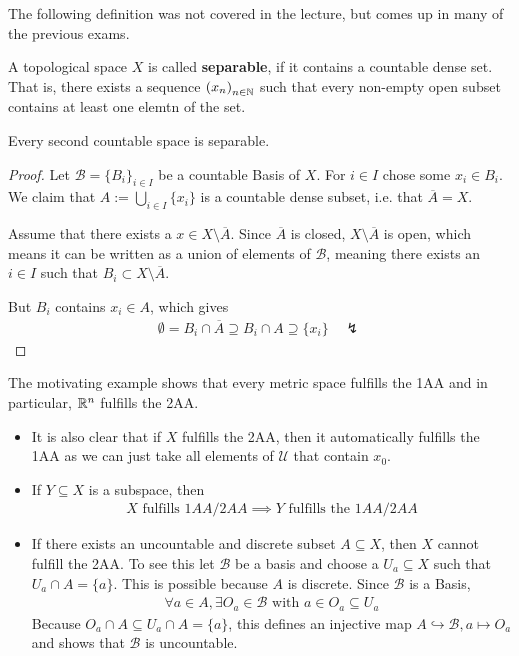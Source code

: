 The following definition was not covered in the lecture, but comes up in many of the previous exams.
\begin{dfn}[]
  A topological space $X$ is called \textbf{separable}, if it contains a countable dense set.
  That is, there exists a sequence $\left(x_{n}\right)_{n \in \mathbb{N}}$ such that every non-empty open subset contains at least one elemtn of the set.
\end{dfn}
\begin{lem}[]
  Every second countable space is separable.
\end{lem}
\begin{proof}
  Let $\mathcal{B} = \{B_i\}_{i \in I}$ be a countable Basis of $X$.
  For $i \in I$ chose some $x_i \in B_i$. 
  We claim that $A := \bigcup_{i \in I} \{x_i\}$ is a countable dense subset, i.e. that $\overline{A} = X$.

  Assume that there exists a $x \in X \setminus \overline{A}$. 
  Since $\overline{A}$ is closed, $X \setminus \overline{A}$ is open, which means it can be written as a union of elements of $\mathcal{B}$, meaning there exists an $i \in I$ such that $B_i \subset X \setminus \overline{A}$.

  But $B_i$ contains $x_i \in A$, which gives
  \begin{align*}
    \emptyset = B_i \cap \overline{A} \supseteq B_i \cap A \supseteq \{x_i\} \quad \lightning
  \end{align*}
\end{proof}

  The motivating example shows that every metric space fulfills the 1AA and in particular, $\mathbb{R}^{n}$ fulfills the 2AA.
\begin{itemize}
  \item It is also clear that if $X$ fulfills the 2AA, then it automatically fulfills the 1AA as we can just take all elements of $\mathcal{U}$ that contain $x_0$.
  \item If $Y \subseteq X$ is a subspace, then 
    \begin{align*}
      X \text{ fulfills } 1AA/2AA \implies Y \text{ fulfills the } 1AA/2AA
    \end{align*}
  \item If there exists an uncountable and discrete subset $A \subseteq X$, then $X$ cannot fulfill the 2AA.
    To see this let $\mathcal{B}$ be a basis and choose a $U_a \subseteq X$ such that $U_a \cap A = \{a\}$. This is possible because $A$ is discrete.
    Since $\mathcal{B}$ is a Basis, 
    \begin{align*}
     \forall a \in A, \exists O_a \in \mathcal{B} \text{ with }a  \in O_a \subseteq U_a
    \end{align*}
    Because $O_a \cap A \subseteq U_a \cap A = \{a\}$, this defines an injective map
    $
      A \hookrightarrow \mathcal{B}, a \mapsto O_a 
    $
    and shows that $\mathcal{B}$ is uncountable.
\end{itemize}

